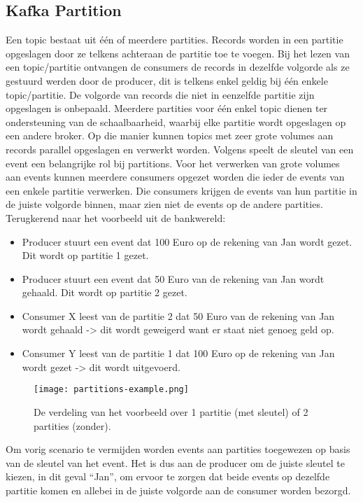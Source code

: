 \subsection{Kafka Partition}
Een topic bestaat uit \'e\'en of meerdere partities. Records worden in een partitie opgeslagen door ze telkens achteraan de partitie toe te voegen. Bij het lezen van een topic/partitie ontvangen de consumers de records in dezelfde volgorde als ze gestuurd werden door de producer, dit is telkens enkel geldig bij één enkele topic/partitie. De volgorde van records die niet in eenzelfde partitie zijn opgeslagen is onbepaald.
Meerdere partities voor \'e\'en enkel topic dienen ter ondersteuning van de schaalbaarheid, waarbij elke partitie wordt opgeslagen op een andere broker. Op die manier kunnen topics met zeer grote volumes aan records parallel opgeslagen en verwerkt worden.
\newline
\newline
Volgens \textcite{Harbour2023} speelt de sleutel van een event een belangrijke rol bij partitions. Voor het verwerken van grote volumes aan events kunnen meerdere consumers opgezet worden die ieder de events van een enkele partitie verwerken. Die consumers krijgen de events van hun partitie in de juiste volgorde binnen, maar zien niet de events op de andere partities. Terugkerend naar het voorbeeld uit de bankwereld:
\begin{itemize}
    \item Producer stuurt een event dat 100 Euro op de rekening van Jan wordt gezet. Dit wordt op partitie 1 gezet.
    \item Producer stuurt een event dat 50 Euro van de rekening van Jan wordt gehaald. Dit wordt op partitie 2 gezet.
    \item Consumer X leest van de partitie 2 dat 50 Euro van de rekening van Jan wordt gehaald -> dit wordt geweigerd want er staat niet genoeg geld op.
    \item Consumer Y leest van de partitie 1 dat 100 Euro op de rekening van Jan wordt gezet -> dit wordt uitgevoerd.
\end{itemize}

\begin{figure}[H]
    \texttt{[image: partitions-example.png]}
    \caption{De verdeling van het voorbeeld over 1 partitie (met sleutel) of 2 partities (zonder).}
\end{figure}

Om vorig scenario te vermijden worden events aan partities toegewezen op basis van de sleutel van het event. Het is dus aan de producer om de juiste sleutel te kiezen, in dit geval ``Jan'', om ervoor te zorgen dat beide events op dezelfde partitie komen en allebei in de juiste volgorde aan de consumer worden bezorgd.



